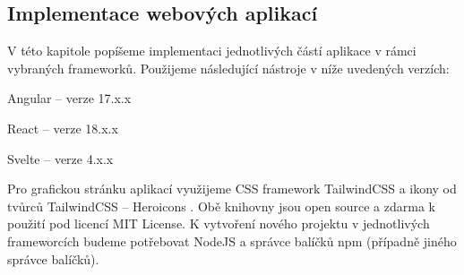 \subsection{Implementace webových aplikací}

V této kapitole popíšeme implementaci jednotlivých částí aplikace v rámci vybraných frameworků. Použijeme následující nástroje v níže uvedených verzích:

\begin{citemize}
	\item Angular -- verze 17.x.x
	\item React -- verze 18.x.x
	\item Svelte -- verze 4.x.x
\end{citemize}

Pro grafickou stránku aplikací využijeme CSS framework TailwindCSS \cite{tailwindcssframework} a ikony od tvůrců TailwindCSS -- Heroicons \cite{heroiconslib}. 
Obě knihovny jsou open source a zdarma k použití pod licencí MIT License. 
K vytvoření nového projektu v jednotlivých frameworcích budeme potřebovat NodeJS a správce balíčků npm (případně jiného správce balíčků).

